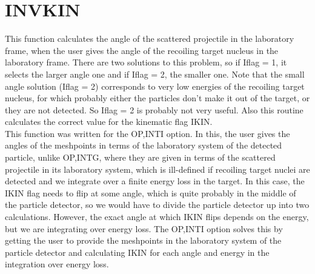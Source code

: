 \section{INVKIN}
\label{sect:invkin}

\noindent This function calculates the angle of the scattered projectile in
the laboratory frame, when the user gives the angle of the recoiling target
nucleus in the laboratory frame. There are two solutions to this problem, so
if Iflag = 1, it selects the larger angle one and if Iflag = 2, the smaller
one. Note that the small angle solution (Iflag = 2) corresponds to very low
energies of the recoiling target nucleus, for which probably either the
particles don't make it out of the target, or they are not detected. So
Iflag = 2 is probably not very useful. Also this routine calculates the
correct value for the kinematic flag IKIN.\\

\noindent This function was written for the OP,INTI option. In this, the
user gives the angles of the meshpoints in terms of the laboratory system of
the detected particle, unlike OP,INTG, where they are given in terms of the
scattered projectile in its laboratory system, which is ill-defined if
recoiling target nuclei are detected and we integrate over a finite energy
loss in the target. In this case, the IKIN flag needs to flip at some angle,
which is quite probably in the middle of the particle detector, so we would
have to divide the particle detector up into two calculations. However, the
exact angle at which IKIN flips depends on the energy, but we are
integrating over energy loss. The OP,INTI option solves this by getting the
user to provide the meshpoints in the laboratory system of the particle
detector and calculating IKIN for each angle and energy in the integration
over energy loss.\\

